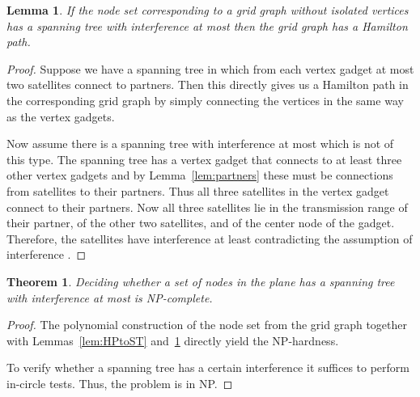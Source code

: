 \documentclass{article}
\theoremstyle{plain}
\newtheorem{thm}{Theorem}
\newtheorem{lem}{Lemma}
\theoremstyle{definition}
\theoremstyle{remark}
\begin{document}
\begin{lem}\label{lem:STtoHP}
If the node set corresponding to a grid graph without isolated vertices has
a spanning tree with interference at most  then the grid graph has a
Hamilton path.
\end{lem}
\begin{proof}
Suppose we have a spanning tree in which from each vertex gadget at most two satellites
connect to partners. Then this directly gives us a Hamilton path in the corresponding
grid graph by simply connecting the vertices in the same way as the vertex gadgets.

Now assume there is a spanning tree with interference at most  which is not
of this type. The spanning tree has a vertex gadget that connects to at least three
other vertex gadgets and by Lemma~\ref{lem:partners} these must be connections from
satellites to their partners. Thus all three satellites in the vertex gadget connect to their
partners. Now all three satellites lie in the transmission range of their partner, of the
other two satellites, and of the center node of the gadget. Therefore, the satellites have interference
at least  contradicting the assumption of interference .
\end{proof}

\begin{thm}\label{thm:nphard}
Deciding whether a set of nodes in the plane has a spanning tree with
interference at most  is NP-complete.
\end{thm}
\begin{proof}
The polynomial construction of the node set from the grid graph together
with Lemmas~\ref{lem:HPtoST} and~\ref{lem:STtoHP} directly yield the NP-hardness.

To verify whether a spanning tree has a certain interference
it suffices to perform
 in-circle tests. Thus, the problem is in NP.
\end{proof}
\end{document}
